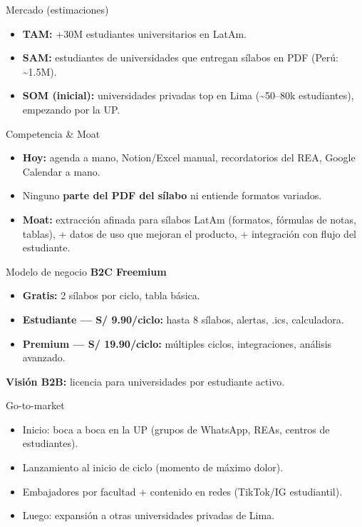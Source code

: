 \documentclass[aspectratio=169]{beamer}
\begin{document}
\begin{frame}{Mercado (estimaciones)}
  \begin{itemize}
    \item \textbf{TAM:} +30M estudiantes universitarios en LatAm.
    \item \textbf{SAM:} estudiantes de universidades que entregan sílabos en PDF (Perú: \textasciitilde 1.5M).
    \item \textbf{SOM (inicial):} universidades privadas top en Lima (\textasciitilde 50–80k estudiantes), empezando por la UP.
  \end{itemize}
\end{frame}

\begin{frame}{Competencia \& Moat}
  \begin{itemize}
    \item \textbf{Hoy:} agenda a mano, Notion/Excel manual, recordatorios del REA, Google Calendar a mano.
    \item Ninguno \textbf{parte del PDF del sílabo} ni entiende formatos variados.
    \item \textbf{Moat:} extracción afinada para sílabos LatAm (formatos, fórmulas de notas, tablas), + datos de uso que mejoran el producto, + integración con flujo del estudiante.
  \end{itemize}
\end{frame}

\begin{frame}{Modelo de negocio}
  \textbf{B2C Freemium}
  \begin{itemize}
    \item \textbf{Gratis:} 2 sílabos por ciclo, tabla básica.
    \item \textbf{Estudiante — S/ 9.90/ciclo:} hasta 8 sílabos, alertas, .ics, calculadora.
    \item \textbf{Premium — S/ 19.90/ciclo:} múltiples ciclos, integraciones, análisis avanzado.
  \end{itemize}
  \vspace{0.2cm}
  \textbf{Visión B2B:} licencia para universidades por estudiante activo.
\end{frame}

\begin{frame}{Go-to-market}
  \begin{itemize}
    \item Inicio: boca a boca en la UP (grupos de WhatsApp, REAs, centros de estudiantes).
    \item Lanzamiento al inicio de ciclo (momento de máximo dolor).
    \item Embajadores por facultad + contenido en redes (TikTok/IG estudiantil).
    \item Luego: expansión a otras universidades privadas de Lima.
  \end{itemize}
\end{frame}
\end{document}
